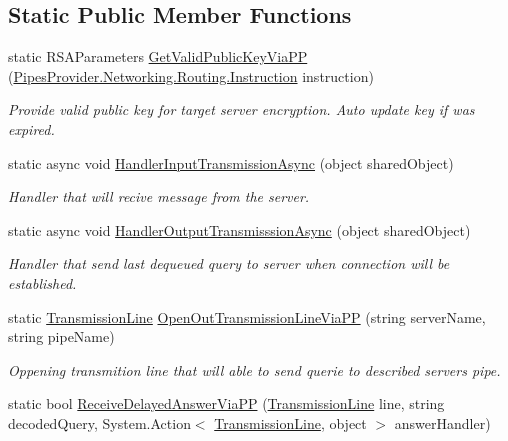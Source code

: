 \subsection*{Static Public Member Functions}
\begin{DoxyCompactItemize}
\item 
static R\+S\+A\+Parameters \mbox{\hyperlink{class_uniform_client_1_1_base_client_a849e820e6135840e615b759cb09cd2dd}{Get\+Valid\+Public\+Key\+Via\+PP}} (\mbox{\hyperlink{class_pipes_provider_1_1_networking_1_1_routing_1_1_instruction}{Pipes\+Provider.\+Networking.\+Routing.\+Instruction}} instruction)
\begin{DoxyCompactList}\small\item\em Provide valid public key for target server encryption. Auto update key if was expired. \end{DoxyCompactList}\item 
static async void \mbox{\hyperlink{class_uniform_client_1_1_base_client_a8b0bf0f5c032239a7b1bdc73d2d5ad3d}{Handler\+Input\+Transmission\+Async}} (object shared\+Object)
\begin{DoxyCompactList}\small\item\em Handler that will recive message from the server. \end{DoxyCompactList}\item 
static async void \mbox{\hyperlink{class_uniform_client_1_1_base_client_a233b9fc7f1cdc4df399115938afd917d}{Handler\+Output\+Transmisssion\+Async}} (object shared\+Object)
\begin{DoxyCompactList}\small\item\em Handler that send last dequeued query to server when connection will be established. \end{DoxyCompactList}\item 
static \mbox{\hyperlink{class_pipes_provider_1_1_client_1_1_transmission_line}{Transmission\+Line}} \mbox{\hyperlink{class_uniform_client_1_1_base_client_a56ba8d0360e3c65a69d2d69db878ec23}{Open\+Out\+Transmission\+Line\+Via\+PP}} (string server\+Name, string pipe\+Name)
\begin{DoxyCompactList}\small\item\em Oppening transmition line that will able to send querie to described server\textquotesingle{}s pipe. \end{DoxyCompactList}\item 
static bool \mbox{\hyperlink{class_uniform_client_1_1_base_client_aa6a13dcf0a4dbefd681cf7eb333813aa}{Receive\+Delayed\+Answer\+Via\+PP}} (\mbox{\hyperlink{class_pipes_provider_1_1_client_1_1_transmission_line}{Transmission\+Line}} line, string decoded\+Query, System.\+Action$<$ \mbox{\hyperlink{class_pipes_provider_1_1_client_1_1_transmission_line}{Transmission\+Line}}, object $>$ answer\+Handler)

\end{DoxyCompactItemize}
